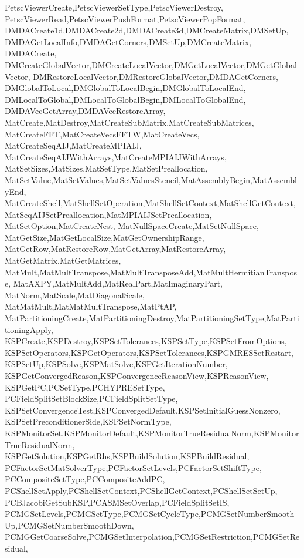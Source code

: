 {{{{{    PetscViewerCreate,PetscViewerSetType,PetscViewerDestroy,
    PetscViewerRead,PetscViewerPushFormat,PetscViewerPopFormat,
    DMDACreate1d,DMDACreate2d,DMDACreate3d,DMCreateMatrix,DMSetUp,
    DMDAGetLocalInfo,DMDAGetCorners,DMSetUp,DMCreateMatrix,
    DMDACreate, %
    DMCreateGlobalVector,DMCreateLocalVector,DMGetLocalVector,DMGetGlobalVector,
    DMRestoreLocalVector,DMRestoreGlobalVector,DMDAGetCorners,
    DMGlobalToLocal,DMGlobalToLocalBegin,DMGlobalToLocalEnd,
    DMLocalToGlobal,DMLocalToGlobalBegin,DMLocalToGlobalEnd,
    DMDAVecGetArray,DMDAVecRestoreArray,
    MatCreate,MatDestroy,MatCreateSubMatrix,MatCreateSubMatrices,
    MatCreateFFT,MatCreateVecsFFTW,MatCreateVecs,
    MatCreateSeqAIJ,MatCreateMPIAIJ,
    MatCreateSeqAIJWithArrays,MatCreateMPIAIJWithArrays,
    MatSetSizes,MatSizes,MatSetType,MatSetPreallocation,
    MatSetValue,MatSetValues,MatSetValuesStencil,MatAssemblyBegin,MatAssemblyEnd,
    MatCreateShell,MatShellSetOperation,MatShellSetContext,MatShellGetContext,
    MatSeqAIJSetPreallocation,MatMPIAIJSetPreallocation,    
    MatSetOption,MatCreateNest,
    MatNullSpaceCreate,MatSetNullSpace,
    MatGetSize,MatGetLocalSize,MatGetOwnershipRange,
    MatGetRow,MatRestoreRow,MatGetArray,MatRestoreArray,
    MatGetMatrix,MatGetMatrices,
    MatMult,MatMultTranspose,MatMultTransposeAdd,MatMultHermitianTranspose,
    MatAXPY,MatMultAdd,MatRealPart,MatImaginaryPart,
    MatNorm,MatScale,MatDiagonalScale,
    MatMatMult,MatMatMultTranspose,MatPtAP,
    MatPartitioningCreate,MatPartitioningDestroy,MatPartitioningSetType,MatPartitioningApply,
    KSPCreate,KSPDestroy,KSPSetTolerances,KSPSetType,KSPSetFromOptions,
    KSPSetOperators,KSPGetOperators,KSPSetTolerances,KSPGMRESSetRestart,
    KSPSetUp,KSPSolve,KSPMatSolve,KSPGetIterationNumber,
    KSPGetConvergedReason,KSPConvergenceReasonView,KSPReasonView,
    KSPGetPC,PCSetType,PCHYPRESetType,
    PCFieldSplitSetBlockSize,PCFieldSplitSetType,
    KSPSetConvergenceTest,KSPConvergedDefault,KSPSetInitialGuessNonzero,
    KSPSetPreconditionerSide,KSPSetNormType,
    KSPMonitorSet,KSPMonitorDefault,KSPMonitorTrueResidualNorm,KSPMonitorTrueResidualNorm,
    KSPGetSolution,KSPGetRhs,KSPBuildSolution,KSPBuildResidual,
    PCFactorSetMatSolverType,PCFactorSetLevels,PCFactorSetShiftType,
    PCCompositeSetType,PCCompositeAddPC,
    PCShellSetApply,PCShellSetContext,PCShellGetContext,PCShellSetSetUp,
    PCBJacobiGetSubKSP,PCASMSetOverlap,PCFieldSplitSetIS,
    PCMGSetLevels,PCMGSetType,PCMGSetCycleType,PCMGSetNumberSmoothUp,PCMGSetNumberSmoothDown,
    PCMGGetCoarseSolve,PCMGSetInterpolation,PCMGSetRestriction,PCMGSetResidual,
}}}}}
